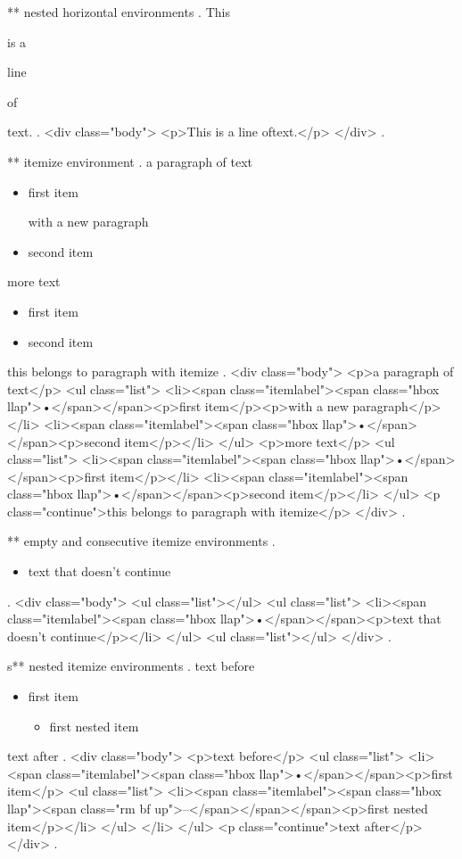 ** nested horizontal environments
.
This \begin{empty}is a \begin{empty}line\end{empty} of\end{empty} text.
.
<div class="body">
<p>This is a line​ of​ text.</p>
</div>
.



** itemize environment
.
a paragraph of text

\begin{itemize}
    \item first item

        with a new paragraph
    \item second item
\end{itemize}
%

more text

\begin{itemize}
    \item first item
    \item second item

\end{itemize}
this belongs to paragraph with itemize
.
<div class="body">
<p>a paragraph of text</p>
<ul class="list">
<li><span class="itemlabel"><span class="hbox llap">•</span></span><p>ﬁrst item</p><p>with a new paragraph</p></li>
<li><span class="itemlabel"><span class="hbox llap">•</span></span><p>second item</p></li>
</ul>
<p>more text</p>
<ul class="list">
<li><span class="itemlabel"><span class="hbox llap">•</span></span><p>ﬁrst item</p></li>
<li><span class="itemlabel"><span class="hbox llap">•</span></span><p>second item</p></li>
</ul>
<p class="continue">this belongs to paragraph with itemize</p>
</div>
.


** empty and consecutive itemize environments
.
\begin{itemize}

\end{itemize}
\begin{itemize}
    \item text that doesn't continue
\end{itemize}
\begin{itemize}
\end{itemize}
.
<div class="body">
<ul class="list"></ul>
<ul class="list">
<li><span class="itemlabel"><span class="hbox llap">•</span></span><p>text that doesn’t continue</p></li>
</ul>
<ul class="list"></ul>
</div>
.


s** nested itemize environments
.
text before
\begin{itemize}
    \item first item
        \begin{itemize}
            \item first nested item
        \end{itemize}
\end{itemize}
text after
.
<div class="body">
<p>text before</p>
<ul class="list">
<li><span class="itemlabel"><span class="hbox llap">•</span></span><p>ﬁrst item</p>
<ul class="list">
<li><span class="itemlabel"><span class="hbox llap"><span class="rm bf up">–</span></span></span><p>ﬁrst nested item</p></li>
</ul>
</li>
</ul>
<p class="continue">text after</p>
</div>
.


